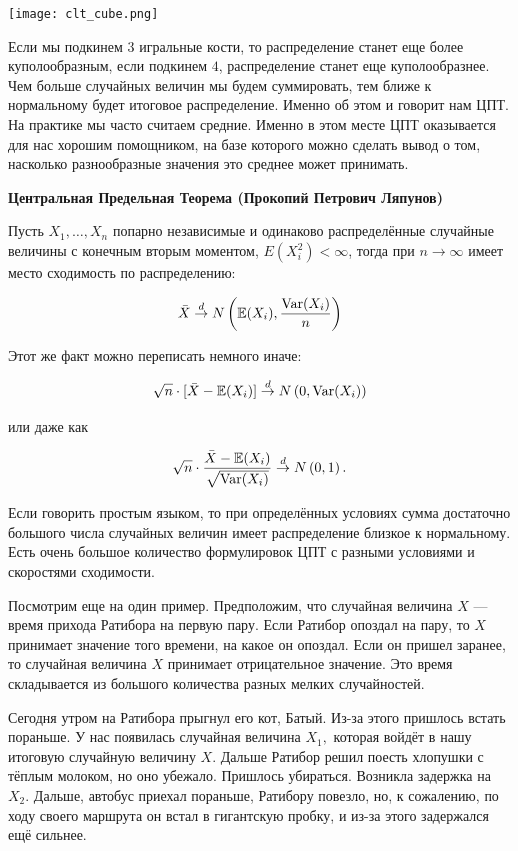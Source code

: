 \documentclass[12pt, a4paper, oneside]{article}
\begin{document}
\begin{center} 
\texttt{[image: clt\_cube.png]}
\end{center} 

Если мы подкинем $3$ игральные кости, то распределение станет еще более куполообразным, если подкинем $4$, распределение станет еще куполообразнее. Чем больше случайных величин мы будем суммировать, тем ближе к нормальному будет итоговое распределение. Именно об этом и говорит нам ЦПТ. На практике мы часто считаем средние. Именно в этом месте ЦПТ оказывается для нас хорошим помощником, на базе которого можно сделать вывод о том, насколько разнообразные значения это среднее может принимать. 

\begin{theorem}{\textbf{Центральная Предельная Теорема (Прокопий Петрович Ляпунов)}}

Пусть $X_1, \ldots, X_n$ попарно независимые и одинаково распределённые случайные величины с конечным вторым моментом, $E(X_i^2) < \infty$, тогда при $n \to \infty$ имеет место сходимость по распределению: 

$$
\bar{X} \overset{d}{\to} N \left(\mathbb{E}(X_i), \frac{\operatorname{Var}(X_i)}{n} \right)
$$

Этот же факт можно переписать немного иначе:

\[\sqrt{n} \cdot [\bar X - \mathbb{E}(X_i)]  \overset{d}{\to} N \left(0, \operatorname{Var}(X_i)\right)\]

или даже как

\[\sqrt{n} \cdot \frac{\bar{X} - \mathbb{E}(X_i)}{\sqrt{\operatorname{Var}(X_i)}}  \overset{d}{\to} N \left(0, 1\right).\]

\end{theorem}

Если говорить простым языком, то при определённых условиях сумма достаточно большого числа случайных величин имеет распределение близкое к нормальному. Есть очень большое количество формулировок ЦПТ с разными условиями и скоростями сходимости.  

Посмотрим еще на один пример. Предположим, что случайная величина $X$ --- время прихода Ратибора на первую пару. Если Ратибор опоздал на пару, то $X$ принимает значение того времени, на какое он опоздал. Если он пришел заранее, то случайная величина $X$ принимает отрицательное значение. Это время складывается из большого количества разных мелких случайностей. 

Сегодня утром на Ратибора прыгнул его кот, Батый. Из-за этого пришлось встать пораньше. У нас появилась случайная величина $X_1,$ которая войдёт в нашу итоговую случайную величину $X.$ Дальше Ратибор решил поесть хлопушки с тёплым молоком, но оно убежало. Пришлось убираться. Возникла задержка на $X_2.$  Дальше, автобус приехал пораньше, Ратибору повезло, но, к сожалению, по ходу своего маршрута он встал в гигантскую пробку, и из-за этого задержался ещё сильнее. 
\end{document}
